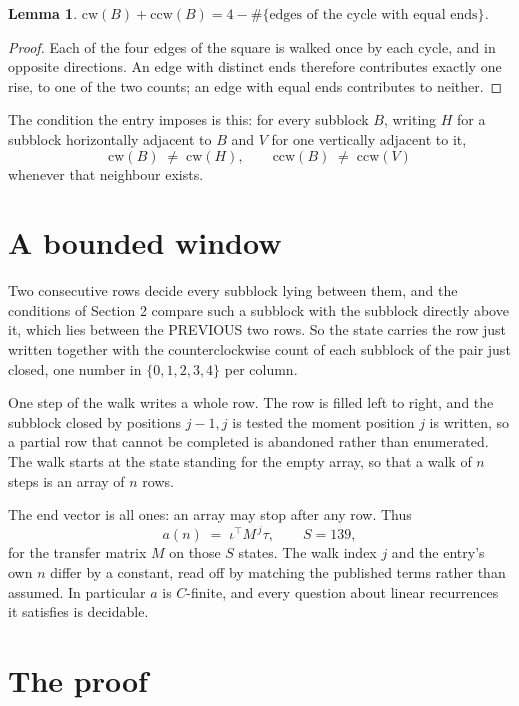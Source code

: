 \documentclass[11pt,a4paper]{article}
\theoremstyle{plain}
\newtheorem{lemma}[theorem]{Lemma}
\theoremstyle{definition}
\begin{document}
\begin{lemma}\label{lem:sum}
$\mathrm{cw}(B)+\mathrm{ccw}(B)=4-\#\{\text{edges of the cycle with equal ends}\}$.
\end{lemma}

\begin{proof}
Each of the four edges of the square is walked once by each cycle, and in opposite directions.
An edge with distinct ends therefore contributes exactly one rise, to one of the two counts;
an edge with equal ends contributes to neither.
\end{proof}

The condition the entry imposes is this: for every subblock $B$, writing $H$ for a subblock horizontally adjacent to $B$ and $V$ for one vertically adjacent to it,
\[
\mathrm{cw}(B)\;\ne\;\mathrm{cw}(H),\qquad \mathrm{ccw}(B)\;\ne\;\mathrm{ccw}(V)
\]
whenever that neighbour exists.

\section{A bounded window}

Two consecutive rows decide every subblock lying between them, and the conditions of Section 2 compare such a subblock with the subblock directly above it, which lies between the PREVIOUS two rows. So the state carries the row just written together with the counterclockwise count of each subblock of the pair just closed, one number in $\{0,1,2,3,4\}$ per column.

One step of the walk writes a whole row. The row is filled left to right, and the subblock
closed by positions $j-1,j$ is tested the moment position $j$ is written, so a partial row that
cannot be completed is abandoned rather than enumerated. The walk starts at the state standing
for the empty array, so that a walk of $n$ steps is an array of $n$ rows.

The end vector is all ones: an array may stop after any row. Thus
\[
a(n)\;=\;\iota^{\!\top}M^{\,j}\tau ,\qquad S=139,
\]
for the transfer matrix $M$ on those $S$ states. The walk index $j$ and the entry's own $n$
differ by a constant, read off by matching the published terms rather than assumed. In
particular $a$ is $C$-finite, and every question about linear recurrences it satisfies is
decidable.

\section{The proof}
\end{document}

